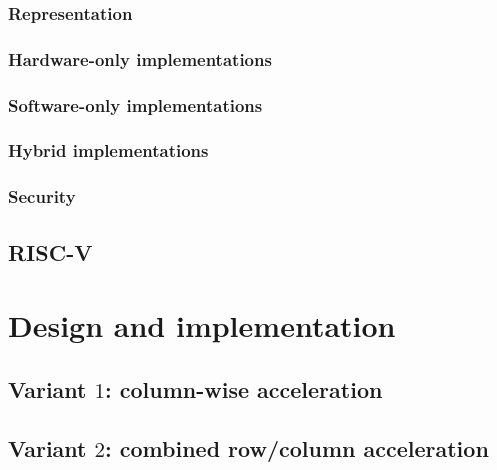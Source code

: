 \documentclass[submission]{iacrtrans}
\begin{document}
\subsubsection{Representation}
\label{sec:bg:aes_impl_rep}


\subsubsection{Hardware-only implementations}
\label{sec:bg:aes_impl_hw}

\subsubsection{Software-only implementations}
\label{sec:bg:aes_impl_sw}

\subsubsection{Hybrid        implementations}
\label{sec:bg:aes_impl_ise}


\subsubsection{Security}
\label{sec:bg:aes_impl_sec}



\subsection{RISC-V}
\label{sec:bg:riscv}



\section{Design and implementation}
\label{sec:design}



\subsection{Variant $1$: column-wise acceleration}
\label{sec:design:v1}


\subsection{Variant $2$: combined row/column acceleration}
\label{sec:design:v2}

\end{document}
